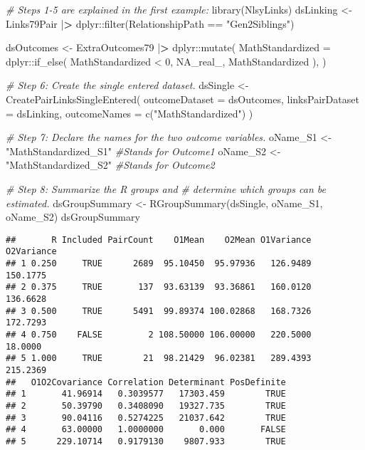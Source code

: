 \documentclass[smallextended]{svjour3}       %
\newenvironment{Shaded}{\begin{snugshade}}{\end{snugshade}}
\newcommand{\AttributeTok}[1]{\textcolor[rgb]{0.77,0.63,0.00}{#1}}
\newcommand{\CommentTok}[1]{\textcolor[rgb]{0.56,0.35,0.01}{\textit{#1}}}
\newcommand{\ConstantTok}[1]{\textcolor[rgb]{0.00,0.00,0.00}{#1}}
\newcommand{\DecValTok}[1]{\textcolor[rgb]{0.00,0.00,0.81}{#1}}
\newcommand{\ErrorTok}[1]{\textcolor[rgb]{0.64,0.00,0.00}{\textbf{#1}}}
\newcommand{\FunctionTok}[1]{\textcolor[rgb]{0.00,0.00,0.00}{#1}}
\newcommand{\NormalTok}[1]{#1}
\newcommand{\OtherTok}[1]{\textcolor[rgb]{0.56,0.35,0.01}{#1}}
\newcommand{\SpecialCharTok}[1]{\textcolor[rgb]{0.00,0.00,0.00}{#1}}
\newcommand{\StringTok}[1]{\textcolor[rgb]{0.31,0.60,0.02}{#1}}
\begin{document}
\begin{Shaded}
\begin{Highlighting}[]
\CommentTok{\# Steps 1{-}5 are explained in the first example:}
\FunctionTok{library}\NormalTok{(NlsyLinks)}
\NormalTok{dsLinking }\OtherTok{\textless{}{-}}
\NormalTok{  Links79Pair }\SpecialCharTok{|}\ErrorTok{\textgreater{}}
\NormalTok{  dplyr}\SpecialCharTok{::}\FunctionTok{filter}\NormalTok{(RelationshipPath }\SpecialCharTok{==} \StringTok{"Gen2Siblings"}\NormalTok{)}

\NormalTok{dsOutcomes }\OtherTok{\textless{}{-}}
\NormalTok{  ExtraOutcomes79 }\SpecialCharTok{|}\ErrorTok{\textgreater{}}
\NormalTok{  dplyr}\SpecialCharTok{::}\FunctionTok{mutate}\NormalTok{(}
    \AttributeTok{MathStandardized =}\NormalTok{ dplyr}\SpecialCharTok{::}\FunctionTok{if\_else}\NormalTok{(}
\NormalTok{      MathStandardized }\SpecialCharTok{\textless{}} \DecValTok{0}\NormalTok{,}
      \ConstantTok{NA\_real\_}\NormalTok{,}
\NormalTok{      MathStandardized}
\NormalTok{    ),}
\NormalTok{  )}

\CommentTok{\# Step 6: Create the single entered dataset.}
\NormalTok{dsSingle }\OtherTok{\textless{}{-}}
  \FunctionTok{CreatePairLinksSingleEntered}\NormalTok{(}
    \AttributeTok{outcomeDataset   =}\NormalTok{ dsOutcomes,}
    \AttributeTok{linksPairDataset =}\NormalTok{ dsLinking,}
    \AttributeTok{outcomeNames     =} \FunctionTok{c}\NormalTok{(}\StringTok{"MathStandardized"}\NormalTok{)}
\NormalTok{  )}

\CommentTok{\# Step 7: Declare the names for the two outcome variables.}
\NormalTok{oName\_S1 }\OtherTok{\textless{}{-}} \StringTok{"MathStandardized\_S1"} \CommentTok{\#Stands for Outcome1}
\NormalTok{oName\_S2 }\OtherTok{\textless{}{-}} \StringTok{"MathStandardized\_S2"} \CommentTok{\#Stands for Outcome2}

\CommentTok{\# Step 8: Summarize the R groups and}
\CommentTok{\#   determine which groups can be estimated.}
\NormalTok{dsGroupSummary }\OtherTok{\textless{}{-}} \FunctionTok{RGroupSummary}\NormalTok{(dsSingle, oName\_S1, oName\_S2)}
\NormalTok{dsGroupSummary}
\end{Highlighting}
\end{Shaded}

\begin{verbatim}
##       R Included PairCount    O1Mean    O2Mean O1Variance O2Variance
## 1 0.250     TRUE      2689  95.10450  95.97936   126.9489   150.1775
## 2 0.375     TRUE       137  93.63139  93.36861   160.0120   136.6628
## 3 0.500     TRUE      5491  99.89374 100.02868   168.7326   172.7293
## 4 0.750    FALSE         2 108.50000 106.00000   220.5000    18.0000
## 5 1.000     TRUE        21  98.21429  96.02381   289.4393   215.2369
##   O1O2Covariance Correlation Determinant PosDefinite
## 1       41.96914   0.3039577   17303.459        TRUE
## 2       50.39790   0.3408090   19327.735        TRUE
## 3       90.04116   0.5274225   21037.642        TRUE
## 4       63.00000   1.0000000       0.000       FALSE
## 5      229.10714   0.9179130    9807.933        TRUE
\end{verbatim}
\end{document}
